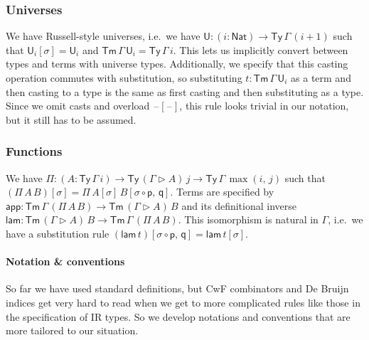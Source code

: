 \documentclass[acmsmall,screen,review]{acmart}
\newcommand{\msf}[1]{{\mathsf{#1}}}
\newcommand{\p}{\mathsf{p}}
\newcommand{\q}{\mathsf{q}}
\newcommand{\U}{\msf{U}}
\newcommand{\Nat}{\msf{Nat}}
\newcommand{\blank}{{\mathord{\hspace{1pt}\text{--}\hspace{1pt}}}}
\newcommand{\Ty}{\msf{Ty}}
\newcommand{\Tm}{\msf{Tm}}
\newcommand{\ext}{\triangleright}
\newcommand{\lam}{\msf{lam}}
\newcommand{\app}{\msf{app}}
\begin{document}
\subsubsection{Universes}
We have Russell-style universes, i.e.\ we have $\U : (i : \Nat) \to \Ty\,\Gamma\,(i + 1)$ such that
$\U_i[\sigma] = \U_i$ and $\Tm\,\Gamma\,\U_i = \Ty\,\Gamma\,i$.  This lets us implicitly convert
between types and terms with universe types. Additionally, we specify that this casting operation
commutes with substitution, so substituting $t : \Tm\,\Gamma\,\U_i$ as a term and then casting to a
type is the same as first casting and then substituting as a type. Since we omit casts and overload
$\blank[\blank]$, this rule looks trivial in our notation, but it still has to be assumed.

\subsubsection{Functions} We have $\Pi : (A : \Ty\,\Gamma\,i) \to \Ty\,(\Gamma \ext A)\,j \to \Ty\,\Gamma\,\max(i,\,j)$
such that $(\Pi\,A\,B)[\sigma] = \Pi\,A[\sigma]\,B[\sigma\circ\p,\,\q]$.  Terms are specified by
$\app : \Tm\,\Gamma\,(\Pi\,A\,B) \to \Tm\,(\Gamma\ext A)\,B$ and its definitional inverse $\lam :
\Tm\,(\Gamma\ext A)\,B \to \Tm\,\Gamma\,(\Pi\,A\,B)$. This isomorphism is natural in $\Gamma$,
i.e.\ we have a substitution rule $(\lam\,t)[\sigma\circ\p,\,\q] = \lam\,t[\sigma]$.

\paragraph{Notation \& conventions} So far we have used standard definitions, but
CwF combinators and De Bruijn indices get very hard to read when we get to more complicated
rules like those in the specification of IR types. So we develop notations and conventions that are
more tailored to our situation.
\end{document}
